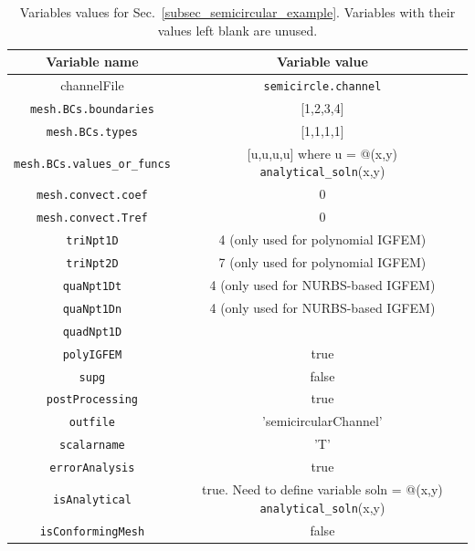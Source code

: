 \documentclass[11pt,letterpaper]{article}
\begin{document}
\begin{table}[!h]
\caption{Variables values for Sec.\ \ref{subsec_semicircular_example}. Variables with their values left blank are unused. }
\label{tab_semicircular1}
\centering
\begin{tabular}{|c|c|}
\hline
Variable name & Variable value\\
\hline
channelFile & \texttt{semicircle.channel}\\
\hline
\texttt{mesh.BCs.boundaries} & [1,2,3,4]\\
\hline
\texttt{mesh.BCs.types} & [1,1,1,1] \\
\hline
\texttt{mesh.BCs.values\_or\_funcs} & [u,u,u,u] where u = @(x,y) \texttt{analytical\_soln}(x,y) \\
\hline
\texttt{mesh.convect.coef} & 0\\
\hline
\texttt{mesh.convect.Tref} & 0 \\
\hline
\texttt{triNpt1D} & 4 (only used for polynomial IGFEM) \\
\hline
\texttt{triNpt2D} & 7 (only used for polynomial IGFEM)\\
\hline
\texttt{quaNpt1Dt} & 4 (only used for NURBS-based IGFEM) \\
\hline
\texttt{quaNpt1Dn} &  4 (only used for NURBS-based IGFEM) \\
\hline
\texttt{quadNpt1D} & \\
\hline
\texttt{polyIGFEM} & true\\
\hline
\texttt{supg} & false \\
\hline
\texttt{postProcessing} & true \\
\hline 
\texttt{outfile} & 'semicircularChannel' \\
\hline
\texttt{scalarname} & 'T' \\
\hline
\texttt{errorAnalysis} & true \\
\hline
\texttt{isAnalytical} & true. Need to define variable soln = @(x,y) \texttt{analytical\_soln}(x,y)\\
\hline
\texttt{isConformingMesh} & false \\
\hline
\end{tabular}
\end{table}
\end{document}
